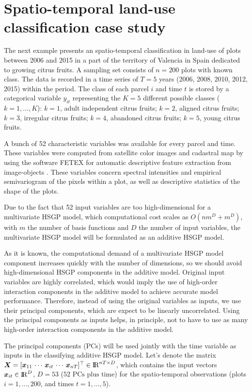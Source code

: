 \documentclass[onecolumn,a4paper,11pt]{article}
\begin{document}
\section{Spatio-temporal land-use classification case study}\label{ch5_sec_application_caseII}


The next example presents an spatio-temporal classification in land-use of plots between 2006 and 2015 in a part of the territory of Valencia in Spain dedicated to growing citrus fruits. A sampling set consists of $n=200$ plots with known class. The data is recorded in a time series of $T=5$ years (2006, 2008, 2010, 2012, 2015) within the period. The class of each parcel $i$ and time $t$ is stored by a categorical variable $y_{it}$ representing the $K=5$ different possible classes ($k=1,\dots,K$): $k=1$, adult independent citrus fruits; $k=2$, aligned citrus fruits; $k=3$, irregular citrus fruits; $k=4$, abandoned citrus fruits; $k=5$, young citrus fruits. 

A bunch of 52 characteristic variables was available for every parcel and time. These variables were computed from satellite color images and cadastral map by using the software FETEX for automatic descriptive feature extraction from image-objects \citep{ruiz2011feature}. These variables concern spectral intensities and empirical semivariogram of the pixels within a plot, as well as descriptive statistics of the shape of the plots.

Due to the fact that 52 input variables are too high-dimensional for a multivariate HSGP model, which computational cost scales as $O(n m^D+m^D)$, with $m$ the number of basis functions and $D$ the number of input variables, the multivariate HSGP model will be formulated as an additive HSGP model. 

As it is known, the computational demand of a multivariate HSGP model component increases quickly with the number of dimensions, so we should avoid high-dimensional HSGP components in the additive model. Original input variables are highly correlated, which would imply the use of high-order interaction components in the additive model to achieve accurate model performance. Therefore, instead of using the original variables as inputs, we use their principal components, which are expect to be linearly uncorrelated. Using the principal components as inputs helps, in principle, not to have to use as many high-order interaction components in the additive model.  

The principal components (PCs) will be used jointly with the time variable as inputs in the classifying additive HSGP model. Let's denote the matrix $\bm{X}=[\bm{x}_{11}\, \cdots \, \bm{x}_{it} \, \cdots \, \bm{x}_{nT}]^\top \in {\rm I\!R}^{nT\times D}$, which contains the input vectors $\bm{x}_{it} \in {\rm I\!R}^D$, $D=53$ ($52 \text{ PCs plus time}$) for the spatio-temporal observations (plots $i=1,\dots,200$, and times $t=1,\dots,5$). 
\end{document}
